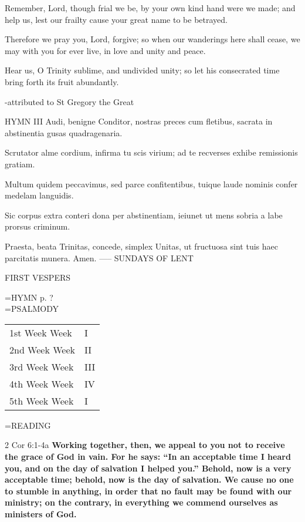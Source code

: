 Remember, Lord, though frial we be,
by your own kind hand were we made;
and help us, lest our frailty
cause your great name to be betrayed.

Therefore we pray you, Lord, forgive;
so when our wanderings here shall cease,
we may with you for ever live,
in love and unity and peace.

Hear us, O Trinity sublime,
and undivided unity;
so let his consecrated time
bring forth its fruit abundantly.

-attributed to St Gregory the Great

HYMN III
Audi, benigne Conditor,
nostras preces cum fletibus,
sacrata in abstinentia
gusas quadragenaria.

Scrutator alme cordium,
infirma tu scis virium;
ad te recverses exhibe
remissionis gratiam.

Multum quidem peccavimus,
sed parce confitentibus,
tuique laude nominis
confer medelam languidis.

Sic corpus extra conteri
dona per abstinentiam,
ieiunet ut mens sobria
a labe prorsus criminum.

Praesta, beata Trinitas,
concede, simplex Unitas,
ut fructuosa sint tuis
haec parcitatis munera. Amen.
-----
SUNDAYS OF LENT
\begin{flushleft}\normalsize FIRST VESPERS\\\end{flushleft}
\hangindent=\parindent \small{\uppercase{HYMN} p.  ?\\}
\hangindent=\parindent \small{PSALMODY}
\begin{center}
\begin{tabular}{ l l }
1st Week	Week &  I\\
2nd Week	Week &  II\\
3rd Week	Week &  III\\
4th Week	Week &  IV\\
5th Week	Week &  I\\
\end{tabular}
\end{center}		

\hangindent=\parindent \small READING
\begin{description}[labelindent=\parindent, leftmargin=*]
\item [Weeks 1-4:]     2 Cor 6:1-4a \textbf{    Working together, then, we appeal to you not to receive the grace of God in vain. For he says: “In an acceptable time I heard you, and on the day of salvation I helped you.” Behold, now is a very acceptable time; behold, now is the day of salvation. We cause no one to stumble in anything, in order that no fault may be found with our ministry; on the contrary, in everything we commend ourselves as ministers of God.}
\end{description}

